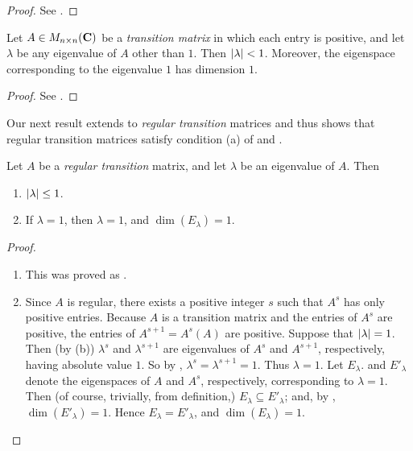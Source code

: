\begin{proof}
See .
\end{proof}

\begin{corollary} \label{corollary 5.17.2}
Let \(A \in M_{n \times n}(\mathbf{C})\) be a \emph{transition matrix} in which each entry is positive, and let \(\lambda\) be any eigenvalue of \(A\) other than \(1\).
Then \(\lvert\lambda\rvert < 1\).
Moreover, the eigenspace corresponding to the eigenvalue \(1\) has dimension \(1\).
\end{corollary}

\begin{proof}
See .
\end{proof}

Our next result extends  to \emph{regular transition} matrices and thus shows that regular transition matrices satisfy condition (a) of  and .

\begin{theorem} \label{thm 5.18}
Let \(A\) be a \emph{regular transition} matrix, and let \(\lambda\) be an eigenvalue of \(A\).
Then
\begin{enumerate}
\item \(\lvert\lambda\rvert \le 1\).
\item If \(\lambda = 1\), then \(\lambda = 1\), and \(\dim(E_{\lambda}) = 1\).
\end{enumerate}
\end{theorem}

\begin{proof} \ 

\begin{enumerate}
\item This was proved as .
\item Since \(A\) is regular, there exists a positive integer \(s\) such that \(A^s\) has only positive entries.
Because \(A\) is a transition matrix and the entries of \(A^s\) are positive, the entries of \(A^{s+1} = A^s(A)\) are positive.
Suppose that \(\lvert\lambda\rvert = 1\).
Then (by (b)) \(\lambda^s\) and \(\lambda^{s+1}\) are eigenvalues of \(A^s\) and \(A^{s + 1}\), respectively, having absolute value \(1\).
So by , \(\lambda^s = \lambda^{s+1} = 1\).
Thus \(\lambda = 1\).
Let \(E_{\lambda}\). and \(E'_{\lambda}\) denote the eigenspaces of \(A\) and \(A^s\), respectively, corresponding to \(\lambda = 1\).
Then (of course, trivially, from definition,) \(E_{\lambda} \subseteq E'_{\lambda}\);
and, by , \(\dim(E'_{\lambda}) = 1\).
Hence \(E_{\lambda} = E'_{\lambda}\), and \(\dim(E_{\lambda}) = 1\).
\end{enumerate}
\end{proof}

